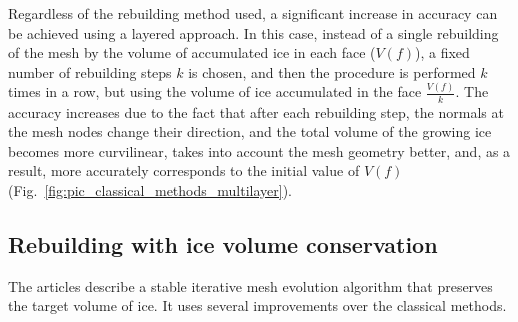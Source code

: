 \documentclass[
11pt,%
tightenlines,%
twoside,%
onecolumn,%
nofloats,%
nobibnotes,%
nofootinbib,%
superscriptaddress,%
noshowpacs,%
centertags]%
{revtex4-2}
\begin{document}
Regardless of the rebuilding method used, a significant increase in accuracy can be achieved using a layered \cite{BourgaultCote} approach.
In this case, instead of a single rebuilding of the mesh by the volume of accumulated ice in each face ($V(f)$), a fixed number of rebuilding steps $k$ is chosen, and then the procedure is performed $k$ times in a row, but using the volume of ice accumulated in the face $\frac{V(f)}{k}$.
The accuracy increases due to the fact that after each rebuilding step, the normals at the mesh nodes change their direction, and the total volume of the growing ice becomes more curvilinear, takes into account the mesh geometry better, and, as a result, more accurately corresponds to the initial value of $V(f)$ (Fig.~\ref{fig:pic_classical_methods_multilayer}).

\subsection{Rebuilding with ice volume conservation}

The articles \cite{Thompson,Tong} describe a stable iterative mesh evolution algorithm that preserves the target volume of ice.
It uses several improvements over the classical methods.
\end{document}
